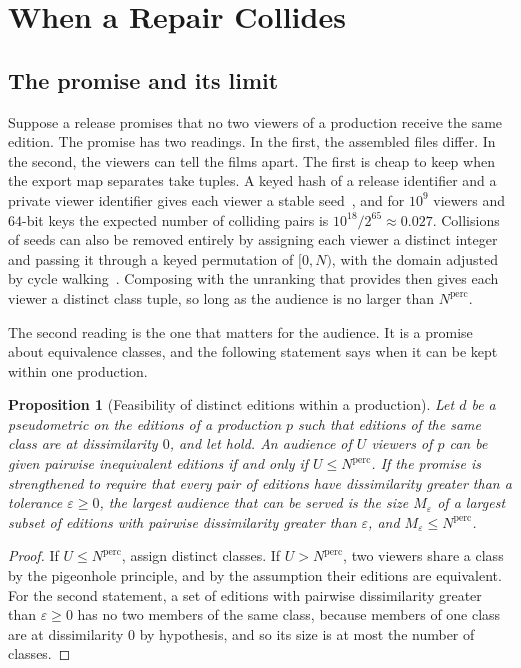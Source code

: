 \documentclass[11pt,twoside,openright]{book}
\theoremstyle{plain}
\newtheorem{proposition}[theorem]{Proposition}
\theoremstyle{definition}
\theoremstyle{remark}
\begin{document}
\section{When a Repair Collides}\label{sec:allocation}

\subsection{The promise and its limit}

Suppose a release promises that no two viewers of a production receive the same edition. The promise has two readings. In the first, the assembled files differ. In the second, the viewers can tell the films apart. The first is cheap to keep when the export map separates take tuples. A keyed hash of a release identifier and a private viewer identifier gives each viewer a stable seed~\cite{rfc2104}, and for $10^9$ viewers and $64$-bit keys the expected number of colliding pairs is $10^{18}/2^{65}\approx0.027$. Collisions of seeds can also be removed entirely by assigning each viewer a distinct integer and passing it through a keyed permutation of $[0,N)$, with the domain adjusted by cycle walking~\cite{blackrogaway2002}. Composing with the unranking that  provides then gives each viewer a distinct class tuple, so long as the audience is no larger than $N^{\mathrm{perc}}$.

The second reading is the one that matters for the audience. It is a promise about equivalence classes, and the following statement says when it can be kept within one production.

\begin{proposition}[Feasibility of distinct editions within a production]\label{prop:feasible}
Let $d$ be a pseudometric on the editions of a production $p$ such that editions of the same class are at dissimilarity $0$, and let  hold. An audience of $U$ viewers of $p$ can be given pairwise inequivalent editions if and only if $U\le N^{\mathrm{perc}}$. If the promise is strengthened to require that every pair of editions have dissimilarity greater than a tolerance $\varepsilon\ge0$, the largest audience that can be served is the size $M_\varepsilon$ of a largest subset of editions with pairwise dissimilarity greater than $\varepsilon$, and $M_\varepsilon\le N^{\mathrm{perc}}$.
\end{proposition}

\begin{proof}
If $U\le N^{\mathrm{perc}}$, assign distinct classes. If $U>N^{\mathrm{perc}}$, two viewers share a class by the pigeonhole principle, and by the assumption their editions are equivalent. For the second statement, a set of editions with pairwise dissimilarity greater than $\varepsilon\ge0$ has no two members of the same class, because members of one class are at dissimilarity $0$ by hypothesis, and so its size is at most the number of classes.
\end{proof}
\end{document}
